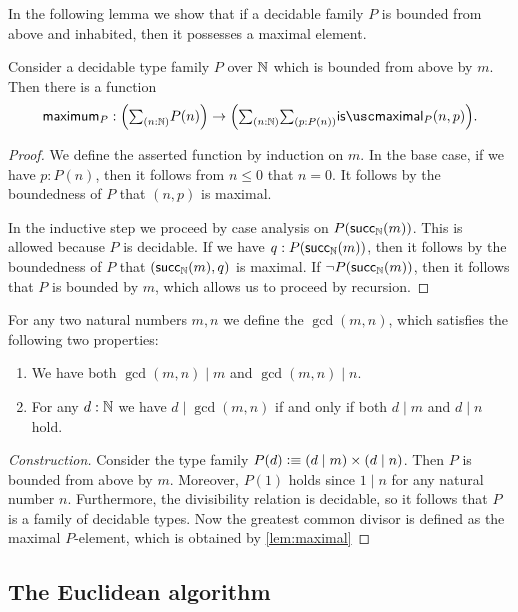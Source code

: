 In the following lemma we show that if a decidable family $P$ is bounded from above and inhabited, then it possesses a maximal element.

\begin{lem}\label{lem:maximal}
  Consider a decidable type family $P$ over ${\mathbb{N}}$ which is bounded from above by $m$. Then there is a function
  \begin{equation*}
    \maximum_P:\Big(\sm{n:\N}P(n)\Big)\to\Big(\sm{n:\N}{p:P(n)}\ismaximal_P(n,p)\Big).
  \end{equation*}
\end{lem}

\begin{proof}
  We define the asserted function by induction on $m$. In the base case, if we have $p:P(n)$, then it follows from $n\leq 0$ that $n=0$. It follows by the boundedness of $P$ that $(n,p)$ is maximal.

  In the inductive step we proceed by case analysis on $P(\mathsf{succ}_{{\mathbb{N}}}(m))$. This is allowed because $P$ is decidable. If we have $q:P(\mathsf{succ}_{{\mathbb{N}}}(m))$, then it follows by the boundedness of $P$ that $(\mathsf{succ}_{{\mathbb{N}}}(m),q)$ is maximal. If $\neg P(\mathsf{succ}_{{\mathbb{N}}}(m))$, then it follows that $P$ is bounded by $m$, which allows us to proceed by recursion.
\end{proof}

\begin{defn}
  For any two natural numbers $m,n$ we define the  $\gcd(m,n)$, which satisfies the following two properties:
  \begin{enumerate}
  \item We have both $\gcd(m,n)\mid m$ and $\gcd(m,n)\mid n$.
  \item For any $d:{\mathbb{N}}$ we have $d\mid \gcd(m,n)$ if and only if both $d\mid m$ and $d\mid n$ hold.
  \end{enumerate}
\end{defn}

\begin{proof}[Construction]
  Consider the type family $P(d)\vcentcolon\equiv (d\mid m)\times (d\mid n)$. Then $P$ is bounded from above by $m$. Moreover, $P(1)$ holds since $1\mid n$ for any natural number $n$. Furthermore, the divisibility relation is decidable, so it follows that $P$ is a family of decidable types. Now the greatest common divisor is defined as the maximal $P$-element, which is obtained by \cref{lem:maximal}
\end{proof}

\subsection{The Euclidean algorithm}

